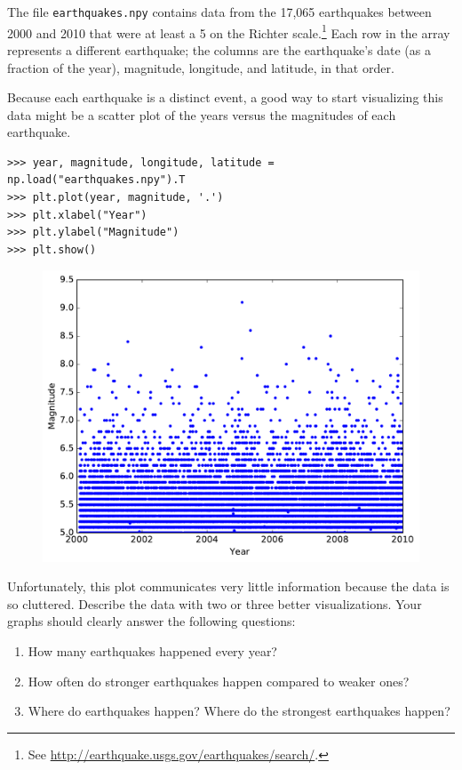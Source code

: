 \begin{problem} %
The file \texttt{earthquakes.npy} contains data from the 17,065 earthquakes between 2000 and 2010 that were at least a 5 on the Richter scale.\footnote{See \url{http://earthquake.usgs.gov/earthquakes/search/}.}
Each row in the array represents a different earthquake;
the columns are the earthquake's date (as a fraction of the year), magnitude, longitude, and latitude, in that order.

Because each earthquake is a distinct event, a good way to start visualizing this data might be a scatter plot of the years versus the magnitudes of each earthquake.

\begin{lstlisting}
>>> year, magnitude, longitude, latitude = np.load("earthquakes.npy").T
>>> plt.plot(year, magnitude, '.')
>>> plt.xlabel("Year")
>>> plt.ylabel("Magnitude")
>>> plt.show()
\end{lstlisting}

\begin{figure}[H] %
    \centering
    \includegraphics[width=.7\textwidth]{figures/earthquake.pdf}
\end{figure}

Unfortunately, this plot communicates very little information because the data is so cluttered.
Describe the data with two or three better visualizations.
Your graphs should clearly answer the following questions:
\begin{enumerate}
    \item How many earthquakes happened every year?
    \item How often do stronger earthquakes happen compared to weaker ones?
    \item Where do earthquakes happen? Where do the strongest earthquakes happen?
\end{enumerate}
\end{problem}

